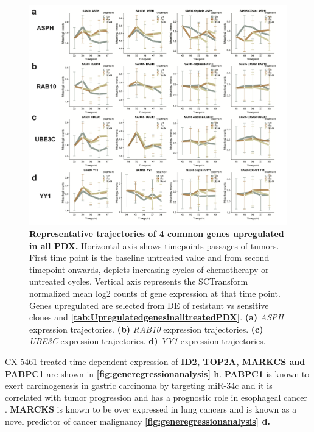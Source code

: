 \begin{figure}
\centering
  \includegraphics[width=\textwidth]{Figures/chap5/commongenesfromvolcanoplots.png}
	
\caption[Representative trajectories of 4 common genes upregulated in all PDX]
	{\small
	\textbf{Representative trajectories of 4 common genes upregulated in all PDX.}
	   Horizontal axis shows timepoints passages of tumors. First time point is the baseline untreated value and from second timepoint onwards, depicts increasing cycles of chemotherapy or untreated cycles. Vertical axis represents the SCTransform normalized mean log2 counts of gene expression at that time point. Genes upregulated are selected from \ac{DE} of resistant vs sensitive clones and \textbf{\autoref{tab:UpregulatedgenesinalltreatedPDX}}.
	   \textbf{(a)} \textit{ASPH} expression trajectories.
	    \textbf{(b)} \textit{RAB10} expression trajectories.
	    \textbf{(c)} \textit{UBE3C} expression trajectories.
	     \textbf{d)} \textit{YY1} expression trajectories.
	}
	\label{fig:commongenesfromvolcanoplots}
\end{figure}


CX-5461 treated time dependent expression of \textbf{ID2, TOP2A, MARKCS and PABPC1} are shown in \textbf{\autoref{fig:generegressionanalysis} h}.
\textbf{PABPC1} is known to exert carcinogenesis in gastric carcinoma by targeting miR-34c and it is correlated with tumor progression and has a prognostic role in esophageal cancer \cite{zhu2015pabpc1,takashima2006expression}. \textbf{MARCKS} is known to be over expressed in lung cancers and is known as a novel predictor of cancer malignancy \cite{reddy2014marcks, chen2014novel} \textbf{\autoref{fig:generegressionanalysis} d.}

